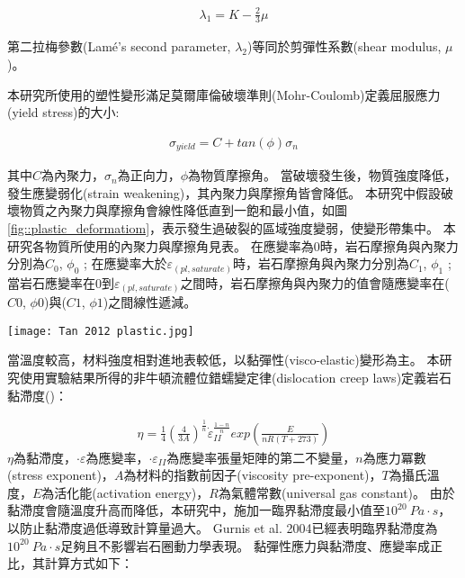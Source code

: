 \begin{align}
\lambda_1 = K - \frac{2}{3}\mu
\end{align}

第二拉梅參數(Lamé's second parameter, $\lambda_2$)等同於剪彈性系數(shear modulus, $\mu$)。

本研究所使用的塑性變形滿足莫爾庫倫破壞準則(Mohr-Coulomb)定義屈服應力(yield stress)的大小:

\begin{align}
    \sigma_{yield}=C+tan(\phi)\sigma_{n}\label{eqn:plastic deformation}
\end{align}

其中$C$為內聚力，$\sigma_n$為正向力，$\phi$為物質摩擦角。
當破壞發生後，物質強度降低，發生應變弱化(strain weakening)，其內聚力與摩擦角皆會降低。
本研究中假設破壞物質之內聚力與摩擦角會線性降低直到一飽和最小值，如圖\ref{fig::plastic_deformatiom}，表示發生過破裂的區域強度變弱，使變形帶集中。
本研究各物質所使用的內聚力與摩擦角見表。
在應變率為$0$時，岩石摩擦角與內聚力分別為$C_0$, $\phi_0$ ; 在應變率大於$\varepsilon_(pl,saturate)$時，岩石摩擦角與內聚力分別為$C_1$, $\phi_1$ ; 當岩石應變率在0到$\varepsilon_(pl,saturate)$之間時，岩石摩擦角與內聚力的值會隨應變率在($C0$, $\phi0$)與($C1$, $\phi1$)之間線性遞減。
\begin{figure*}[ht!]
    \centering
    \texttt{[image: Tan 2012 plastic.jpg]}
    \caption{應力弱化示意圖，摘自\citealp{Tan2012}。岩石摩擦角與內聚力的值會隨應變率在($C_0$, $\phi_0$)與($C_1$, $\phi_1$)之間線性遞減。
    }
    \label{fig::plastic_deformatiom}
\end{figure*}

當溫度較高，材料強度相對進地表較低，以黏彈性(visco-elastic)變形為主。
本研究使用實驗結果所得的非牛頓流體位錯蠕變定律(dislocation creep laws)定義岩石黏滯度(\citealp{Chen1990})：

\begin{align}
   \eta=\frac{1}{4}(\frac{4}{3A})^{\frac{1}{n}} \dot\varepsilon_{II}^{\frac{1-n}{n}} exp(\frac{E}{nR(T+273)})
   \label{eqn:viscousity}
\end{align}
$\eta$為黏滯度，$\cdot\varepsilon$為應變率，$\cdot\varepsilon_{II}$為應變率張量矩陣的第二不變量，$n$為應力冪數(stress exponent)，$A$為材料的指數前因子(viscosity pre-exponent)，$T$為攝氏溫度，$E$為活化能(activation energy)，$R$為氣體常數(universal gas constant)。
由於黏滯度會隨溫度升高而降低，本研究中，施加一臨界黏滯度最小值至$10^{20}\ Pa\cdot s$，以防止黏滯度過低導致計算量過大。
Gurnis et al. 2004已經表明臨界黏滯度為$10^{20}\ Pa\cdot s$足夠且不影響岩石圈動力學表現。
黏彈性應力與黏滯度、應變率成正比，其計算方式如下：	

